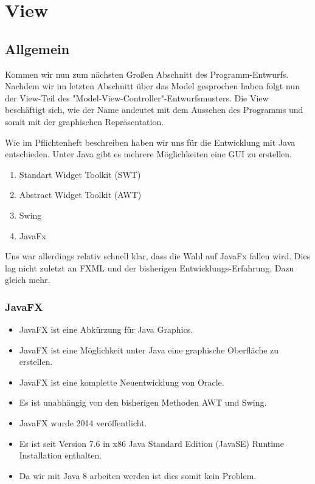 	\section{View}
	\subsection{Allgemein}
		Kommen wir nun zum nächsten Großen Abschnitt des Programm-Entwurfs.
		Nachdem wir im letzten Abschnitt über das Model gesprochen haben folgt nun der View-Teil des "Model-View-Controller"-Entwurfsmusters.
		Die View beschäftigt sich, wie der Name andeutet mit dem Aussehen des Programms und somit mit der graphischen Repräsentation.
		
		Wie im Pflichtenheft beschreiben haben wir uns für die Entwicklung mit Java entschieden.
		Unter Java gibt es mehrere Möglichkeiten eine GUI zu erstellen.
			
			\begin{enumerate}
				\item Standart Widget Toolkit (SWT)
				\item Abstract Widget Toolkit (AWT)
				\item Swing
				\item JavaFx
			\end{enumerate}

		Uns war allerdings relativ schnell klar, dass die Wahl auf JavaFx fallen wird.
		Dies lag nicht zuletzt an FXML und der bisherigen Entwicklungs-Erfahrung.
		Dazu gleich mehr.
		
			\subsubsection{JavaFX}
			\begin{itemize}
			\item JavaFX ist eine Abkürzung für Java Graphics.
			\item JavaFX ist eine Möglichkeit unter Java eine graphische Oberfläche zu erstellen.
			\item JavaFX ist eine komplette Neuentwicklung von Oracle.
			\item Es ist unabhängig von den bisherigen Methoden AWT und Swing.
			\item JavaFX wurde 2014 veröffentlicht.
			\item Es ist seit Version 7.6 in x86 Java Standard Edition (JavaSE) Runtime Installation enthalten.
			\item Da wir mit Java 8 arbeiten werden ist dies somit kein Problem.
			\end{itemize}
			
